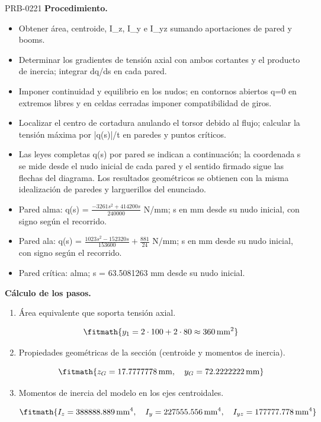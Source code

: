 \begin{studiumworked}{PRB-0221}
\textbf{Procedimiento.}\begin{itemize}\item Obtener área, centroide, I\_z, I\_y e I\_yz sumando aportaciones de pared y booms.
\item Determinar los gradientes de tensión axial con ambos cortantes y el producto de inercia; integrar dq/ds en cada pared.
\item Imponer continuidad y equilibrio en los nudos; en contornos abiertos q=0 en extremos libres y en celdas cerradas imponer compatibilidad de giros.
\item Localizar el centro de cortadura anulando el torsor debido al flujo; calcular la tensión máxima por |q(s)|/t en paredes y puntos críticos.
\item Las leyes completas q(s) por pared se indican a continuación; la coordenada s se mide desde el nudo inicial de cada pared y el sentido firmado sigue las flechas del diagrama. Los resultados geométricos se obtienen con la misma idealización de paredes y larguerillos del enunciado.
\item Pared alma: q(s) = $\frac{- 3261 s^{2} + 414200 s}{240000}$ N/mm; s en mm desde su nudo inicial, con signo según el recorrido.
\item Pared ala: q(s) = $\frac{1023 s^{2} - 152320 s}{153600} + \frac{881}{24}$ N/mm; s en mm desde su nudo inicial, con signo según el recorrido.
\item Pared crítica: alma; s = 63.5081263 mm desde su nudo inicial.\end{itemize}

\textbf{Cálculo de los pasos.}

\begin{enumerate}

\item Área equivalente que soporta tensión axial.

\[\fitmath{y_{1}=2\cdot 100+2\cdot 80\approx 360\,\mathrm{mm^{2}}}\]

\item Propiedades geométricas de la sección (centroide y momentos de inercia).

\[\fitmath{z_G=17.7777778\,\mathrm{mm},\quad y_G=72.2222222\,\mathrm{mm}}\]

\item Momentos de inercia del modelo en los ejes centroidales.

\[\fitmath{I_z=388888.889\,\mathrm{mm}^{4},\quad I_y=227555.556\,\mathrm{mm}^{4},\quad I_{yz}=177777.778\,\mathrm{mm}^{4}}\]


\end{enumerate}
\end{studiumworked}
